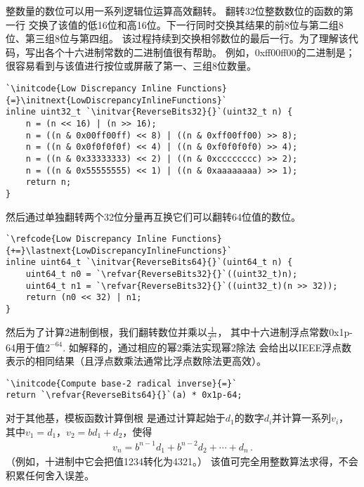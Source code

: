 整数量的数位可以用一系列逻辑位运算高效翻转。
翻转32位整数数位的函数的第一行
交换了该值的低16位和高16位。下一行同时交换其结果的前8位与第二组8位、第三组8位与第四组。
该过程持续到交换相邻数位的最后一行。为了理解该代码，写出各个十六进制常数的二进制值很有帮助。
例如，{\ttfamily 0xff00ff00}的二进制是{}；
很容易看到与该值进行按位或屏蔽了第一、三组8位数量。
\begin{lstlisting}
`\initcode{Low Discrepancy Inline Functions}{=}\initnext{LowDiscrepancyInlineFunctions}`
inline uint32_t `\initvar{ReverseBits32}{}`(uint32_t n) {
    n = (n << 16) | (n >> 16);
    n = ((n & 0x00ff00ff) << 8) | ((n & 0xff00ff00) >> 8);
    n = ((n & 0x0f0f0f0f) << 4) | ((n & 0xf0f0f0f0) >> 4);
    n = ((n & 0x33333333) << 2) | ((n & 0xcccccccc) >> 2);
    n = ((n & 0x55555555) << 1) | ((n & 0xaaaaaaaa) >> 1);
    return n;
}
\end{lstlisting}

然后通过单独翻转两个32位分量再互换它们可以翻转64位值的数位。
\begin{lstlisting}
`\refcode{Low Discrepancy Inline Functions}{+=}\lastnext{LowDiscrepancyInlineFunctions}`
inline uint64_t `\initvar{ReverseBits64}{}`(uint64_t n) {
    uint64_t n0 = `\refvar{ReverseBits32}{}`((uint32_t)n);
    uint64_t n1 = `\refvar{ReverseBits32}{}`((uint32_t)(n >> 32));
    return (n0 << 32) | n1;
}
\end{lstlisting}

然后为了计算2进制倒根，我们翻转数位并乘以$\displaystyle\frac{1}{2^{64}}$，
其中十六进制浮点常数{\ttfamily 0x1p-64}用于值$2^{-64}$.
如解释的，通过相应的幂2乘法实现幂2除法
会给出以IEEE浮点数表示的相同结果（且浮点数乘法通常比浮点数除法更高效）。
\begin{lstlisting}
`\initcode{Compute base-2 radical inverse}{=}`
return `\refvar{ReverseBits64}{}`(a) * 0x1p-64;
\end{lstlisting}

对于其他基，模板函数计算倒根
是通过计算起始于$d_1$的数字$d_i$并计算一系列$v_i$，
其中$v_1=d_1$，$v_2=bd_1+d_2$，使得
\begin{align*}
    v_n=b^{n-1}d_1+b^{n-2}d_2+\cdots+d_n\, .
\end{align*}
（例如，十进制中它会把值1234转化为4321。）
该值可完全用整数算法求得，不会积累任何舍入误差。

